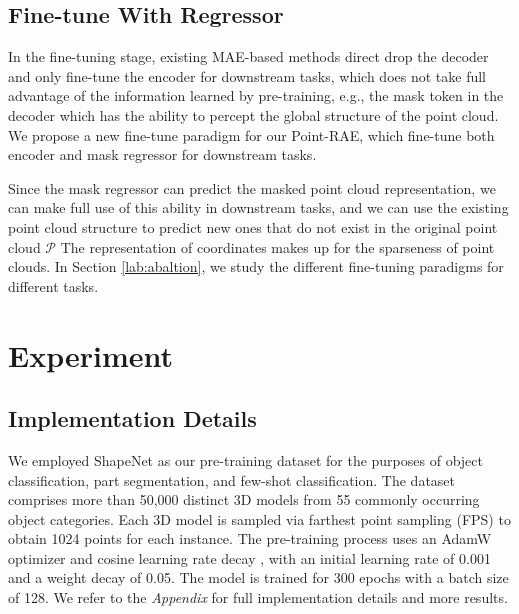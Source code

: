 \documentclass[sigconf, screen]{acmart}
\begin{document}
\subsection{Fine-tune With Regressor}
In the fine-tuning stage, existing MAE-based methods direct drop the decoder and only fine-tune the encoder for downstream tasks, which does not take full advantage of the information learned by pre-training, e.g., the mask token in the decoder which has the ability to percept the global structure of the point cloud.
We propose a new fine-tune paradigm for our Point-RAE, which fine-tune both encoder and mask regressor for downstream tasks.

Since the mask regressor can predict the masked point cloud representation, we can make full use of this ability in downstream tasks, and we can use the existing point cloud structure to predict new ones that do not exist in the original point cloud $\mathcal{P}$ The representation of coordinates makes up for the sparseness of point clouds. 
In Section \ref{lab:abaltion}, we study the different fine-tuning paradigms for different tasks.


\section{Experiment}
\subsection{Implementation Details}
We employed ShapeNet \cite{chang2015shapenet} as our pre-training dataset for the purposes of object classification, part segmentation, and few-shot classification. 
The dataset comprises more than 50,000 distinct 3D models from 55 commonly occurring object categories. 
Each 3D model is sampled via farthest point sampling (FPS) to obtain 1024 points for each instance. The pre-training process uses an AdamW optimizer \cite{loshchilov2017decoupled} and cosine learning rate decay \cite{loshchilov2016sgdr}, with an initial learning rate of 0.001 and a weight decay of 0.05. 
The model is trained for 300 epochs with a batch size of 128.
We refer to the {\it Appendix} for { full implementation details} and more results.
\end{document}
